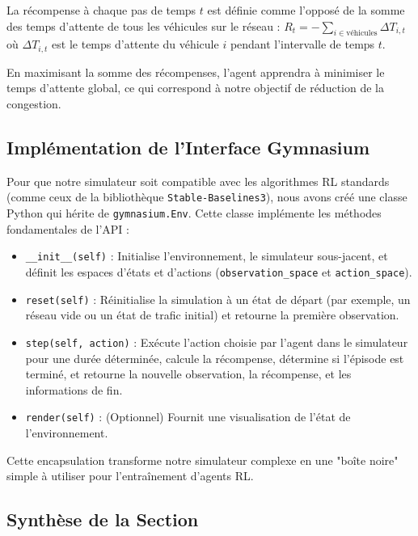La récompense à chaque pas de temps $t$ est définie comme l'opposé de la somme des temps d'attente de tous les véhicules sur le réseau :
$R_t = - \sum_{i \in \text{véhicules}} \Delta T_{i,t}$
où $\Delta T_{i,t}$ est le temps d'attente du véhicule $i$ pendant l'intervalle de temps $t$.

En maximisant la somme des récompenses, l'agent apprendra à minimiser le temps d'attente global, ce qui correspond à notre objectif de réduction de la congestion.

\subsection{Implémentation de l'Interface Gymnasium}
\label{sec:gym_implementation}

Pour que notre simulateur soit compatible avec les algorithmes RL standards (comme ceux de la bibliothèque \texttt{Stable-Baselines3}), nous avons créé une classe Python qui hérite de \texttt{gymnasium.Env}. Cette classe implémente les méthodes fondamentales de l'API :

\begin{itemize}
    \item \texttt{\_\_init\_\_(self)} : Initialise l'environnement, le simulateur sous-jacent, et définit les espaces d'états et d'actions (\texttt{observation\_space} et \texttt{action\_space}).
    \item \texttt{reset(self)} : Réinitialise la simulation à un état de départ (par exemple, un réseau vide ou un état de trafic initial) et retourne la première observation.
    \item \texttt{step(self, action)} : Exécute l'action choisie par l'agent dans le simulateur pour une durée déterminée, calcule la récompense, détermine si l'épisode est terminé, et retourne la nouvelle observation, la récompense, et les informations de fin.
    \item \texttt{render(self)} : (Optionnel) Fournit une visualisation de l'état de l'environnement.
\end{itemize}

Cette encapsulation transforme notre simulateur complexe en une "boîte noire" simple à utiliser pour l'entraînement d'agents RL.

\subsection{Synthèse de la Section}
\label{sec:ch6_conclusion}

